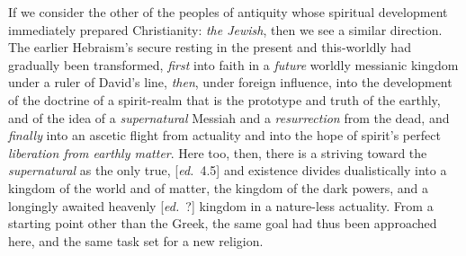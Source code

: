 \documentclass[12pt,a4paper,openany]{book}
\newcommand{\ed}[1]{{\small[\textit{ed.}\ #1]}}
\begin{document}
If we consider the other of the peoples of antiquity whose spiritual development
immediately prepared Christianity: \emph{the Jewish}, then we see
a similar direction. The earlier Hebraism's secure resting in the
present and this-worldly had gradually been transformed, \emph{first} into
faith in a \emph{future} worldly messianic kingdom under a ruler of David's
line, \emph{then}, under foreign influence, into the development of the doctrine
of a spirit-realm that is the prototype and truth of the earthly, and of
the idea of a \emph{supernatural} Messiah and a \emph{resurrection} from the
dead, and \emph{finally} into an ascetic flight from actuality and into the hope
of spirit's perfect \emph{liberation from earthly matter}. Here too, then,
there is a striving toward the \emph{supernatural} as the only true, \ed{4.5} and
existence divides dualistically into a kingdom of the world and of matter, the
kingdom of the dark powers, and a longingly awaited heavenly \ed{?}
kingdom in a nature-less actuality. From a starting point other than the
Greek, the same goal had thus been approached here, and the same
task set for a new religion.
\end{document}
